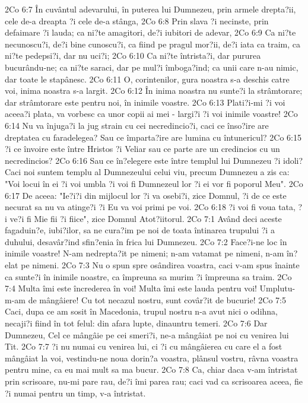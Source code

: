 2Co 6:7  În cuvântul adevarului, în puterea lui Dumnezeu, prin armele drepta?ii, cele de-a dreapta ?i cele de-a stânga,
2Co 6:8  Prin slava ?i necinste, prin defaimare ?i lauda; ca ni?te amagitori, de?i iubitori de adevar,
2Co 6:9  Ca ni?te necunoscu?i, de?i bine cunoscu?i, ca fiind pe pragul mor?ii, de?i iata ca traim, ca ni?te pedepsi?i, dar nu uci?i;
2Co 6:10  Ca ni?te întrista?i, dar pururea bucurându-ne; ca ni?te saraci, dar pe mul?i îmboga?ind; ca unii care n-au nimic, dar toate le stapânesc.
2Co 6:11  O, corintenilor, gura noastra s-a deschis catre voi, inima noastra s-a largit.
2Co 6:12  În inima noastra nu sunte?i la strâmtorare; dar strâmtorare este pentru noi, în inimile voastre.
2Co 6:13  Plati?i-mi ?i voi aceea?i plata, va vorbesc ca unor copii ai mei - largi?i ?i voi inimile voastre!
2Co 6:14  Nu va înjuga?i la jug strain cu cei necredincio?i, caci ce înso?ire are dreptatea cu faradelegea? Sau ce împarta?ire are lumina cu întunericul?
2Co 6:15  ?i ce învoire este între Hristos ?i Veliar sau ce parte are un credincios cu un necredincios?
2Co 6:16  Sau ce în?elegere este între templul lui Dumnezeu ?i idoli? Caci noi suntem templu al Dumnezeului celui viu, precum Dumnezeu a zis ca: "Voi locui în ei ?i voi umbla ?i voi fi Dumnezeul lor ?i ei vor fi poporul Meu".
2Co 6:17  De aceea: "Ie?i?i din mijlocul lor ?i va osebi?i, zice Domnul, ?i de ce este necurat sa nu va atinge?i ?i Eu va voi primi pe voi.
2Co 6:18  ?i voi fi voua tata, ?i ve?i fi Mie fii ?i fiice", zice Domnul Atot?iitorul.
2Co 7:1  Având deci aceste fagaduin?e, iubi?ilor, sa ne cura?im pe noi de toata întinarea trupului ?i a duhului, desavâr?ind sfin?enia în frica lui Dumnezeu.
2Co 7:2  Face?i-ne loc în inimile voastre! N-am nedrepta?it pe nimeni; n-am vatamat pe nimeni, n-am în?elat pe nimeni.
2Co 7:3  Nu o spun spre osândirea voastra, caci v-am spus înainte ca sunte?i în inimile noastre, ca împreuna sa murim ?i împreuna sa traim.
2Co 7:4  Multa îmi este încrederea în voi! Multa îmi este lauda pentru voi! Umplutu-m-am de mângâiere! Cu tot necazul nostru, sunt covâr?it de bucurie!
2Co 7:5  Caci, dupa ce am sosit în Macedonia, trupul nostru n-a avut nici o odihna, necaji?i fiind în tot felul: din afara lupte, dinauntru temeri.
2Co 7:6  Dar Dumnezeu, Cel ce mângâie pe cei smeri?i, ne-a mângâiat pe noi cu venirea lui Tit.
2Co 7:7  ?i nu numai cu venirea lui, ci ?i cu mângâierea cu care el a fost mângâiat la voi, vestindu-ne noua dorin?a voastra, plânsul vostru, râvna voastra pentru mine, ca eu mai mult sa ma bucur.
2Co 7:8  Ca, chiar daca v-am întristat prin scrisoare, nu-mi pare rau, de?i îmi parea rau; caci vad ca scrisoarea aceea, fie ?i numai pentru un timp, v-a întristat.
